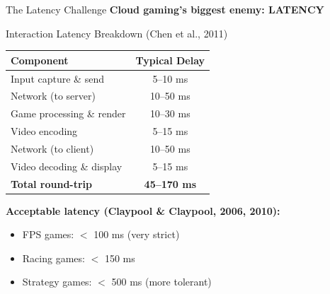 \documentclass[aspectratio=169,12pt]{beamer}
\begin{document}
\begin{frame}{The Latency Challenge}
    \textbf{Cloud gaming's biggest enemy: LATENCY}
    
    \vspace{0.3cm}
    \begin{block}{Interaction Latency Breakdown (Chen et al., 2011)}
        \begin{center}
            \begin{tabular}{l|c}
                \toprule
                \textbf{Component} & \textbf{Typical Delay} \\
                \midrule
                Input capture \& send & 5--10 ms \\
                Network (to server) & 10--50 ms \\
                Game processing \& render & 10--30 ms \\
                Video encoding & 5--15 ms \\
                Network (to client) & 10--50 ms \\
                Video decoding \& display & 5--15 ms \\
                \midrule
                \textbf{Total round-trip} & \textbf{45--170 ms} \\
                \bottomrule
            \end{tabular}
        \end{center}
    \end{block}
    
    \vspace{0.2cm}
    \textbf{Acceptable latency (Claypool \& Claypool, 2006, 2010):}
    \begin{itemize}
        \item FPS games: $<$ 100 ms (very strict)
        \item Racing games: $<$ 150 ms
        \item Strategy games: $<$ 500 ms (more tolerant)
    \end{itemize}
\end{frame}
\end{document}
